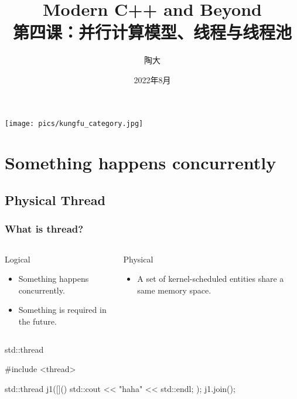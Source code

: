 \documentclass[UTF8,lualatex]{ctexbeamer}
\title{\kaishu Modern C++ and Beyond\\
    第四课：并行计算模型、线程与线程池}
\author{陶大}
\date{2022年8月}
\begin{document}
\songti

\begin{frame}[plain]
    \titlepage
\end{frame}

\begin{frame}[plain]
    \begin{center}
        \texttt{[image: pics/kungfu\_category.jpg]}
    \end{center}
\end{frame}

\begin{frame}[plain]
    \tableofcontents
\end{frame}

\section{Something happens concurrently}

\subsection{Physical Thread}

\begin{frame}[fragile]
    \frametitle{What is thread?}
    \begin{columns}[t]
        \begin{column}{.5\textwidth}
            \begin{block}{Logical}
                \begin{itemize}
                    \item Something happens concurrently.
                    \item Something is required in the future.
                \end{itemize}
            \end{block}
        \end{column}
        \begin{column}{.5\textwidth}
            \begin{block}{Physical}
                \begin{itemize}
                    \item A set of kernel-scheduled entities share a same memory space.
                \end{itemize}
            \end{block}
        \end{column}
    \end{columns}
    \begin{exampleblock}{std::thread}
        \scriptsize
        \begin{cppcode}
            #include <thread>

            std::thread j1([](){
                std::cout << "haha" << std::endl;
            });
            j1.join();
        \end{cppcode}
    \end{exampleblock}
\end{frame}
\end{document}
